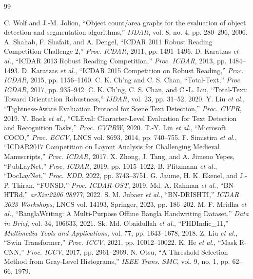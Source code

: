 \documentclass[10pt]{article}
\begin{document}
{\footnotesize
\begin{thebibliography}{99}
\setlength{\itemsep}{0.05em}

 C. Wolf and J.-M. Jolion, ``Object count/area graphs for the evaluation of object detection and segmentation algorithms,'' \emph{IJDAR}, vol. 8, no. 4, pp. 280--296, 2006.
 A. Shahab, F. Shafait, and A. Dengel, ``ICDAR 2011 Robust Reading Competition Challenge 2,'' \emph{Proc. ICDAR}, 2011, pp. 1491--1496.
 D. Karatzas \emph{et al.}, ``ICDAR 2013 Robust Reading Competition,'' \emph{Proc. ICDAR}, 2013, pp. 1484--1493.
 D. Karatzas \emph{et al.}, ``ICDAR 2015 Competition on Robust Reading,'' \emph{Proc. ICDAR}, 2015, pp. 1156--1160.
 C. K. Ch'ng and C. S. Chan, ``Total-Text,'' \emph{Proc. ICDAR}, 2017, pp. 935--942.
 C. K. Ch'ng, C. S. Chan, and C.-L. Liu, ``Total-Text: Toward Orientation Robustness,'' \emph{IJDAR}, vol. 23, pp. 31--52, 2020.
 Y. Liu \emph{et al.}, ``Tightness-Aware Evaluation Protocol for Scene Text Detection,'' \emph{Proc. CVPR}, 2019.
 Y. Baek \emph{et al.}, ``CLEval: Character-Level Evaluation for Text Detection and Recognition Tasks,'' \emph{Proc. CVPRW}, 2020.
 T.-Y. Lin \emph{et al.}, ``Microsoft COCO,'' \emph{Proc. ECCV}, LNCS vol. 8693, 2014, pp. 740--755.
 F. Simistira \emph{et al.}, ``ICDAR2017 Competition on Layout Analysis for Challenging Medieval Manuscripts,'' \emph{Proc. ICDAR}, 2017.
 X. Zhong, J. Tang, and A. Jimeno Yepes, ``PubLayNet,'' \emph{Proc. ICDAR}, 2019, pp. 1015--1022.
 B. Pfitzmann \emph{et al.}, ``DocLayNet,'' \emph{Proc. KDD}, 2022, pp. 3743--3751.
 G. Jaume, H. K. Ekenel, and J.-P. Thiran, ``FUNSD,'' \emph{Proc. ICDAR-OST}, 2019.
 Md. A. Rahman \emph{et al.}, ``BN-HTRd,'' \emph{arXiv:2206.08977}, 2022.
 S. M. Jubaer \emph{et al.}, ``BN-DRISHTI,'' \emph{ICDAR 2023 Workshops}, LNCS vol. 14193, Springer, 2023, pp. 186--202.
 M. F. Mridha \emph{et al.}, ``BanglaWriting: A Multi-Purpose Offline Bangla Handwriting Dataset,'' \emph{Data in Brief}, vol. 34, 106633, 2021.
 Sk. Md. Obaidullah \emph{et al.}, ``PHDIndic\_11,'' \emph{Multimedia Tools and Applications}, vol. 77, pp. 1643--1678, 2018.
 Z. Liu \emph{et al.}, ``Swin Transformer,'' \emph{Proc. ICCV}, 2021, pp. 10012--10022.
 K. He \emph{et al.}, ``Mask R-CNN,'' \emph{Proc. ICCV}, 2017, pp. 2961--2969.
 N. Otsu, ``A Threshold Selection Method from Gray-Level Histograms,'' \emph{IEEE Trans. SMC}, vol. 9, no. 1, pp. 62--66, 1979.

\end{thebibliography}
}
\end{document}
